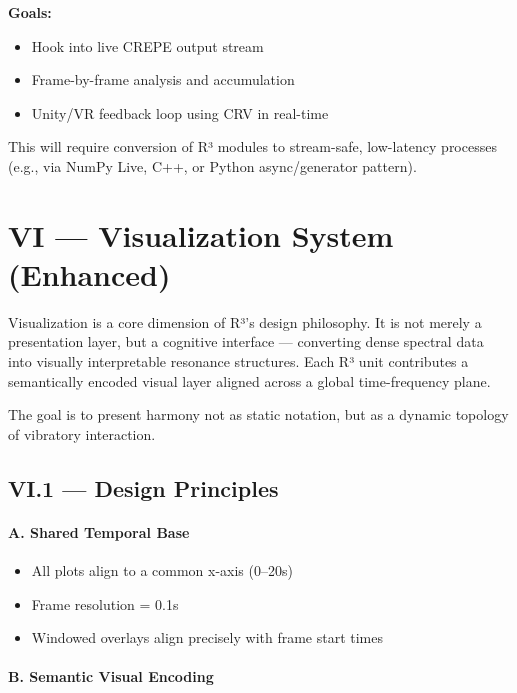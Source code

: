 \textbf{Goals:}

\begin{itemize}
    \item Hook into live CREPE output stream
    \item Frame-by-frame analysis and accumulation
    \item Unity/VR feedback loop using CRV in real-time
\end{itemize}

This will require conversion of R³ modules to stream-safe, low-latency processes (e.g., via NumPy Live, C++, or Python async/generator pattern).

\section*{VI — Visualization System (Enhanced)}

Visualization is a core dimension of R³’s design philosophy. It is not merely a presentation layer, but a cognitive interface — converting dense spectral data into visually interpretable resonance structures. Each R³ unit contributes a semantically encoded visual layer aligned across a global time-frequency plane.

The goal is to present harmony not as static notation, but as a dynamic topology of vibratory interaction.

\subsection*{VI.1 — Design Principles}

\paragraph{A. Shared Temporal Base}

\begin{itemize}
    \item All plots align to a common x-axis (0–20s)
    \item Frame resolution = 0.1s
    \item Windowed overlays align precisely with frame start times
\end{itemize}

\paragraph{B. Semantic Visual Encoding}


